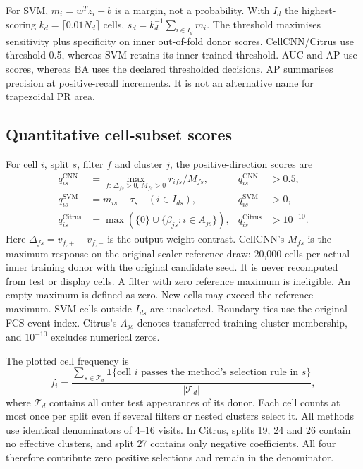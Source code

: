 \documentclass[11pt,a4paper]{article}
\begin{document}
For SVM, $m_i=w^Tz_i+b$ is a margin, not a probability. With $I_d$ the highest-scoring $k_d=\lceil0.01N_d\rceil$ cells, $s_d=k_d^{-1}\sum_{i\in I_d}m_i$. The threshold maximises sensitivity plus specificity on inner out-of-fold donor scores. CellCNN/Citrus use threshold 0.5, whereas SVM retains its inner-trained threshold. AUC and AP use scores, whereas BA uses the declared thresholded decisions. AP summarises precision at positive-recall increments. It is not an alternative name for trapezoidal PR area.

\subsection{Quantitative cell-subset scores}
For cell $i$, split $s$, filter $f$ and cluster $j$, the positive-direction scores are
\[
\begin{aligned}
q^{\mathrm{CNN}}_{is}&=\max_{f:\,\Delta_{fs}>0,\,M_{fs}>0}r_{ifs}/M_{fs}, &q^{\mathrm{CNN}}_{is}&>0.5,\\
q^{\mathrm{SVM}}_{is}&=m_{is}-\tau_s\quad(i\in I_{ds}), &q^{\mathrm{SVM}}_{is}&>0,\\
q^{\mathrm{Citrus}}_{is}&=\max(\{0\}\cup\{\beta_{js}:i\in A_{js}\}), &q^{\mathrm{Citrus}}_{is}&>10^{-10}.
\end{aligned}
\]
Here $\Delta_{fs}=v_{f,+}-v_{f,-}$ is the output-weight contrast. CellCNN's $M_{fs}$ is the maximum response on the original scaler-reference draw: 20,000 cells per actual inner training donor with the original candidate seed. It is never recomputed from test or display cells. A filter with zero reference maximum is ineligible. An empty maximum is defined as zero. New cells may exceed the reference maximum. SVM cells outside $I_{ds}$ are unselected. Boundary ties use the original FCS event index. Citrus's $A_{js}$ denotes transferred training-cluster membership, and $10^{-10}$ excludes numerical zeros.

The plotted cell frequency is
\[
f_i=\frac{\sum_{s\in\mathcal T_d}\mathbf1\{\text{cell }i\text{ passes the method's selection rule in }s\}}
{|\mathcal T_d|},
\]
where $\mathcal T_d$ contains all outer test appearances of its donor. Each cell counts at most once per split even if several filters or nested clusters select it. All methods use identical denominators of 4--16 visits. In Citrus, splits 19, 24 and 26 contain no effective clusters, and split 27 contains only negative coefficients. All four therefore contribute zero positive selections and remain in the denominator.
\end{document}
